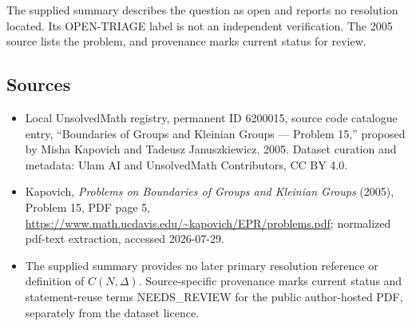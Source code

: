 \documentclass[11pt]{article}
\begin{document}
The supplied summary describes the question as open and reports no resolution located. Its OPEN-TRIAGE label is not an independent verification. The 2005 source lists the problem, and provenance marks current status for review.
\subsection{Sources}
\begin{itemize}
\item Local UnsolvedMath registry, permanent ID 6200015, source code catalogue entry, ``Boundaries of Groups and Kleinian Groups --- Problem 15,'' proposed by Misha Kapovich and Tadeusz Januszkiewicz, 2005. Dataset curation and metadata: Ulam AI and UnsolvedMath Contributors, CC BY 4.0.
\item Kapovich, \emph{Problems on Boundaries of Groups and Kleinian Groups} (2005), Problem 15, PDF page 5, \url{https://www.math.ucdavis.edu/~kapovich/EPR/problems.pdf}; normalized pdf-text extraction, accessed 2026-07-29.
\item The supplied summary provides no later primary resolution reference or definition of $C(N,\Delta)$. Source-specific provenance marks current status and statement-reuse terms NEEDS\_REVIEW for the public author-hosted PDF, separately from the dataset licence.
\end{itemize}
\end{document}
